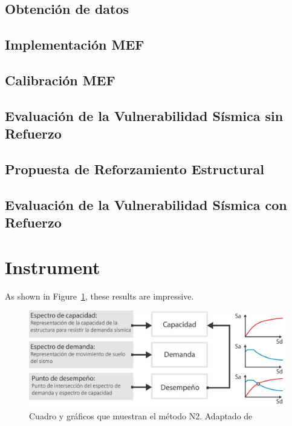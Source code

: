 \documentclass[doc, 12pt, a4paper, draftall]{apa7} %
\begin{document}
\subsection{Obtención de datos}

\subsection{Implementación MEF}

\subsection{Calibración MEF}

\subsection{Evaluación de la Vulnerabilidad Sísmica sin Refuerzo}

\subsection{Propuesta de Reforzamiento Estructural}

\subsection{Evaluación de la Vulnerabilidad Sísmica con Refuerzo}

\backmatter %

\printbibliography[heading=bibintoc, title={Referencias}]

\appendix

\section{Instrument}
\label{app:instrument}

As shown in Figure~\ref{fig:Figure2}, these results are impressive. \lipsum[20]

\begin{figure}[ht]
  \includegraphics[scale=0.36]{E_IMAGENES/3_Capitulo3/Cap3_Imagen70.png}
	\caption{Cuadro y gráficos que muestran el método N2. Adaptado de \cite{deWaal2009}}
	\label{fig:Figure2}
\end{figure}
\end{document}
